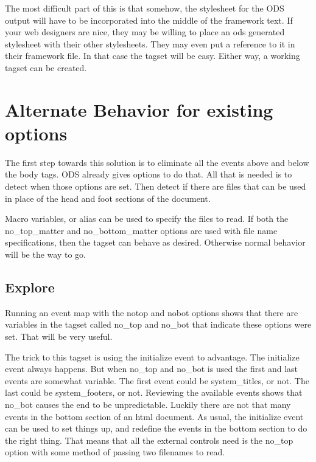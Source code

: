 The most difficult part of this is that somehow, the stylesheet for
the ODS output will have to be incorporated into the middle of the
framework text.  If your web designers are nice, they may be willing
to place an ods generated stylesheet with their other stylesheets.
They may even put a reference to it in their framework file.  In
that case the tagset will be easy.  Either way, a working tagset
can be created.

\section{Alternate Behavior for existing options}
The first step towards this solution is to eliminate all the events
above and below the body tags.  ODS already gives options to do
that.  All that is needed is to detect when those options are set.
Then detect if there are files that can be used in place of the
head and foot sections of the document.

Macro variables, or alias can be used to specify the files to read.
If both the no\_top\_matter and no\_bottom\_matter options are used
with file name specifications, then the tagset can behave as desired.
Otherwise normal behavior will be the way to go.

\subsection{Explore}
Running an event map with the notop and nobot options shows that there are variables in
the tagset called no\_top and no\_bot that indicate these options were set.  That will
be very useful.

The trick to this tagset is using the initialize event to advantage.  The initialize
event always happens.  But when no\_top and no\_bot is used the first and last events
are somewhat variable.   The first event could be system\_titles, or not.  The last could
be system\_footers, or not.  Reviewing the available events shows that no\_bot causes
the end to be unpredictable.  Luckily there are not that many events in the bottom
section of an html document.  As usual, the initialize event can be used to set things up, and
redefine the events in the bottom section to do the right thing.  That means that
all the external controls need is the no\_top option with some method of passing two 
filenames to read.

